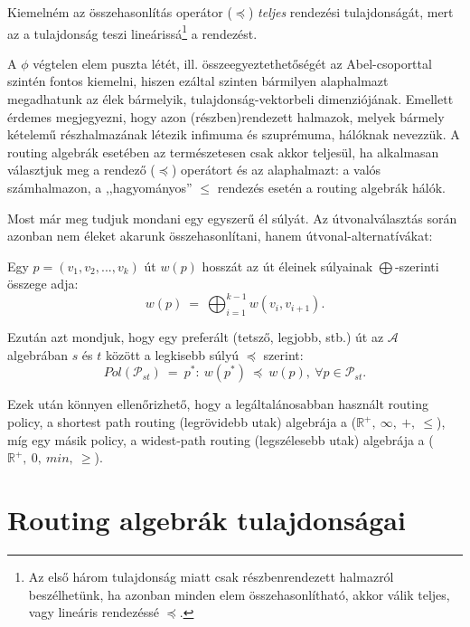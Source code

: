   \begin{note}
    Kiemelném az összehasonlítás operátor ($\preceq$) \emph{teljes} rendezési tulajdonságát, mert az a tulajdonság teszi lineárissá\footnote{Az első három tulajdonság miatt csak részbenrendezett halmazról beszélhetünk, ha azonban minden elem összehasonlítható, akkor válik teljes, vagy lineáris rendezéssé $\preceq$.} a rendezést.
  \end{note}

  \begin{note}
    A $\phi$ végtelen elem puszta létét, ill. összeegyeztethetőségét az Abel-csoporttal szintén fontos kiemelni, hiszen ezáltal szinten bármilyen alaphalmazt megadhatunk az élek bármelyik, tulajdonság-vektorbeli dimenziójának. Emellett érdemes megjegyezni, hogy azon (részben)rendezett halmazok, melyek bármely kételemű részhalmazának létezik infimuma és szuprémuma, hálóknak nevezzük. A routing algebrák esetében az természetesen csak akkor teljesül, ha alkalmasan választjuk meg a rendező ($\preceq$) operátort és az alaphalmazt: a valós számhalmazon, a ,,hagyományos'' $\leq$ rendezés esetén a routing algebrák hálók.
  \end{note}

  Most már meg tudjuk mondani egy egyszerű él súlyát. Az útvonalválasztás során azonban nem éleket akarunk összehasonlítani, hanem útvonal-alternatívákat:

  \begin{definition} 
    Egy $p=(v_{1}, v_{2}, ..., v_{k})$ út $w(p)$ hosszát az út éleinek súlyainak $\bigoplus$-szerinti összege adja: $$w(p)~=~\bigoplus_{i=1}^{k-1}w(v_{i}, v_{i+1}).$$
  \end{definition}

  Ezután azt mondjuk, hogy egy preferált (tetsző, legjobb, stb.) út az $\mathcal{A}$ algebrában $s$ és $t$ között a legkisebb súlyú $\preceq$ szerint: $$Pol(\mathcal{P}_{st})~=~p^{*}:~w(p^{*})~\preceq~w(p),~\forall p \in \mathcal{P}_{st}.$$

  Ezek után könnyen ellenőrizhető, hogy a legáltalánosabban használt routing policy, a shortest path routing (legrövidebb utak) algebrája a ($\mathbb{R}^{+},~\infty,~+,~\leq$), míg egy másik policy, a widest-path routing (legszélesebb utak) algebrája a ($\mathbb{R}^{+},~0,~min,~\geq$).

  \section{Routing algebrák tulajdonságai}\label{sect:section_algebratulajdonsagok}

